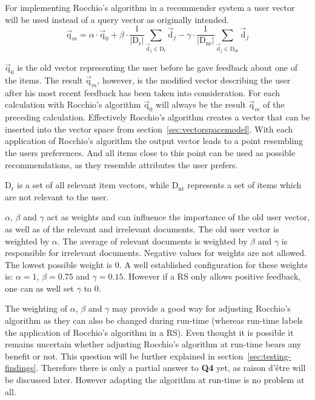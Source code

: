 For implementing Rocchio's algorithm in a recommender system a user vector will be used instead of a query vector as originally intended.
\begin{equation}
    \vec{\text{q}}_m =
        \alpha \cdot \vec{\text{q}}_0
        + \beta \cdot \frac{1}{|\text{D}_\text{r}|}\sum_{\vec{\text{d}}_j\in \text{D}_\text{r}} \vec{\text{d}}_j
        - \gamma \cdot \frac{1}{|\text{D}_\text{nr}|}\sum_{\vec{\text{d}}_j\in \text{D}_\text{nr}} \vec{\text{d}}_j
\end{equation}

$\vec{\text{q}}_0$ is the old vector representing the user before he gave feedback about one of the items.
The result $\vec{\text{q}}_m$, however, is the modified vector describing the user after his most recent feedback has been taken into consideration.
For each calculation with Rocchio's algorithm $\vec{\text{q}}_0$ will always be the result $\vec{\text{q}}_m$ of the preceding calculation.
Effectively Rocchio's algorithm creates a vector that can be inserted into the vector space from section~\ref{sec:vectorspacemodel}.
With each application of Rocchio's algorithm the output vector leads to a point resembling the users preferences.
And all items close to this point can be used as possible recommendations, as they resemble attributes the user prefers.

$\text{D}_\text{r}$ is a set of all relevant item vectors, while $\text{D}_\text{nr}$ represents a set of items which are not relevant to the user.

$\alpha$, $\beta$ and $\gamma$ act as weights and can influence the importance of the old user vector, as well as of  the relevant and irrelevant documents.
The old user vector is weighted by $\alpha$.
The average of relevant documents is weighted by $\beta$ and $\gamma$ is responsible for irrelevant documents.
Negative values for weights are not allowed.
The lowest possible weight is 0.
A well established configuration for these weights is: $\alpha = 1$, $\beta = 0.75$ and $\gamma = 0.15$.
However if a RS only allows positive feedback, one can as well set $\gamma$ to 0.
\citep[p.~178-183]{manning:2009}


The weighting of $\alpha$, $\beta$ and $\gamma$ may provide a good way for adjusting Rocchio's algorithm as they can also be changed during run-time (whereas run-time labels the application of Rocchio's algorithm in a RS).
Even thought it is possible it remains uncertain whether adjusting Rocchio's algorithm at run-time bears any benefit or not.
This question will be further explained in section~\ref{sec:testing-findings}.
Therefore there is only a partial answer to \textbf{Q4} yet, as raison d'\^{e}tre will be discussed later.
However adapting the algorithm at run-time is no problem at all.

